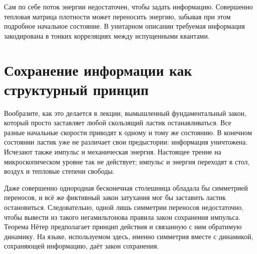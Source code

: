 \begin{classroomqa}
\end{classroomqa}

Сам по себе поток энергии недостаточен, чтобы задать информацию. Совершенно тепловая матрица плотности может переносить энергию, забывая при этом подробное начальное состояние. В унитарном описании требуемая информация закодирована в тонких корреляциях между испущенными квантами.

\section{Сохранение информации как структурный принцип}

\begin{classroomqa}
\end{classroomqa}

Вообразите, как это делается в лекции, вымышленный фундаментальный закон, который просто заставляет любой скользящий ластик останавливаться. Все разные начальные скорости приводят к одному и тому же состоянию. В конечном состоянии ластик уже не различает свои предыстории: информация уничтожена. Исчезают также импульс и механическая энергия. Настоящее трение на микроскопическом уровне так не действует; импульс и энергия переходят в стол, воздух и тепловые степени свободы.

Даже совершенно однородная бесконечная столешница обладала бы симметрией переносов, и всё же фиктивный закон затухания мог бы заставить ластик остановиться. Следовательно, одной лишь симметрии переносов недостаточно, чтобы вывести из такого негамильтонова правила закон сохранения импульса. Теорема Нётер предполагает принцип действия и связанную с ним обратимую динамику. На языке, используемом здесь, именно симметрия вместе с динамикой, сохраняющей информацию, даёт закон сохранения.

